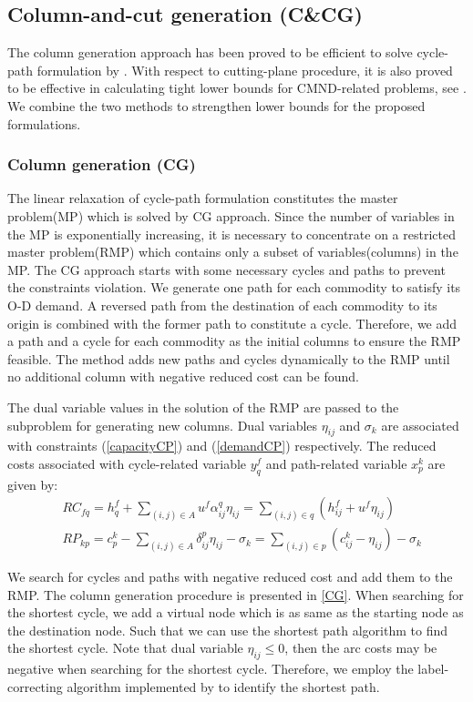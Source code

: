 \documentclass[11pt,nonblindrev,fleqn]{article}
\begin{document}
\subsection{Column-and-cut generation (C\&CG)}
The column generation approach has been proved to be efficient to solve cycle-path formulation by \cite{Andersen2011Branch}. With respect to cutting-plane procedure, it is also proved to be effective in calculating tight lower bounds for CMND-related problems, see \cite{Chouman2009Commodity,Chouman2016Commodity,Chouman2015Cutting}. We combine the two methods to strengthen lower bounds for the proposed formulations.

\subsubsection{Column generation (CG)}
The linear relaxation of cycle-path formulation constitutes the master problem(MP) which is solved by CG approach. Since the number of variables in the MP is exponentially increasing, it is necessary to concentrate on a restricted master problem(RMP) which contains only a subset of variables(columns) in the MP.  The CG approach starts with some necessary cycles and paths to prevent the constraints violation. We generate one path for each commodity to satisfy its O-D demand. A reversed path from the destination of each commodity to its origin is combined with the former path to constitute a cycle. Therefore, we add a path and a cycle for each commodity as the initial columns to ensure the RMP feasible. The method adds new paths and cycles dynamically to the RMP until no additional column with negative reduced cost can be found.

The dual variable values in the solution of the RMP are passed to the subproblem for generating new columns. Dual variables $\eta_{ij}$ and $\sigma_k$ are associated with constraints (\ref{capacityCP}) and (\ref{demandCP}) respectively. The reduced costs associated with cycle-related variable $y_q^f$ and path-related variable $x_p^k$ are given by:
\begin{align}
& RC_{fq} = h_q^f + \sum_{(i,j)\in A} u^f \alpha_{ij}^q \eta_{ij} = \sum_{(i,j)\in q} (h_{ij}^f + u^f \eta_{ij}) \\
& RP_{kp} = c_p^k - \sum_{(i,j)\in A} \delta_{ij}^p \eta_{ij} - \sigma_k = \sum_{(i,j)\in p} (c_{ij}^k - \eta_{ij}) - \sigma_k
\end{align}

We search for cycles and paths with negative reduced cost and add them to the RMP. The column generation procedure is presented in \autoref{CG}. When searching for the shortest cycle, we add a virtual node which is as same as the starting node as the destination node. Such that we can use the shortest path algorithm to find the shortest cycle. Note that dual variable $\eta_{ij} \leq 0$, then the arc costs may be negative when searching for the shortest cycle. Therefore, we employ the label-correcting algorithm implemented by \cite{Ahuja1993Network} to identify the shortest path.
\end{document}
